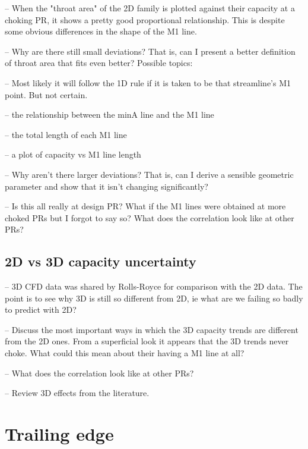 \documentclass[a4paper, 11pt, twoside]{report}
\begin{document}
-- When the "throat area" of the 2D family is plotted against their capacity at a choking PR, it shows a pretty good proportional relationship. This is despite some obvious differences in the shape of the M1 line.

-- Why are there still small deviations? That is, can I present a better definition of throat area that fits even better? Possible topics:

 -- Most likely it will follow the 1D rule if it is taken to be that streamline's M1 point. But not certain.
 
 -- the relationship between the minA line and the M1 line
 
 -- the total length of each M1 line
 
 -- a plot of capacity vs M1 line length

-- Why aren't there larger deviations? That is, can I derive a sensible geometric parameter and show that it isn't changing significantly?

-- Is this all really at design PR? What if the M1 lines were obtained at more choked PRs but I forgot to say so? What does the correlation look like at other PRs?


\section{2D vs 3D capacity uncertainty}

-- 3D CFD data was shared by Rolls-Royce for comparison with the 2D data. The point is to see why 3D is still so different from 2D, ie what are we failing so badly to predict with 2D?

-- Discuss the most important ways in which the 3D capacity trends are different from the 2D ones. From a superficial look it appears that the 3D trends never choke. What could this mean about their having a M1 line at all?

-- What does the correlation look like at other PRs?

-- Review 3D effects from the literature.



\chapter{Trailing edge}
\label{chapter_trailing_edge}
\end{document}
